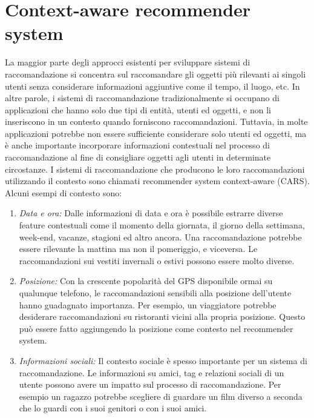 \section{Context-aware recommender system}
La maggior parte degli approcci esistenti per sviluppare sistemi di raccomandazione si concentra sul raccomandare gli oggetti più rilevanti ai singoli utenti senza considerare informazioni aggiuntive come il tempo, il luogo, etc. In altre parole, i sistemi di raccomandazione tradizionalmente si occupano di applicazioni che hanno solo due tipi di entità, utenti ed oggetti, e non li inseriscono in un contesto quando forniscono raccomandazioni. Tuttavia, in molte applicazioni potrebbe non essere sufficiente considerare solo utenti ed oggetti, ma è anche importante incorporare informazioni contestuali nel processo di raccomandazione al fine di consigliare oggetti agli utenti in determinate circostanze. I sistemi di raccomandazione che producono le loro raccomandazioni utilizzando il contesto sono chiamati recommender system context-aware (CARS). Alcuni esempi di contesto sono:

\begin{enumerate}
 \item \textit{Data e ora:} Dalle informazioni di data e ora è possibile estrarre diverse feature contestuali come il momento della giornata, il giorno della settimana, week-end, vacanze, stagioni ed altro ancora. Una raccomandazione potrebbe essere rilevante la mattina ma non il pomeriggio, e viceversa. Le raccomandazioni sui vestiti invernali o estivi possono essere molto diverse.
 \item \textit{Posizione:} Con la crescente popolarità del GPS disponibile ormai su qualunque telefono, le raccomandazioni sensibili alla posizione dell'utente hanno guadagnato importanza. Per esempio, un viaggiatore potrebbe desiderare raccomandazioni su ristoranti vicini alla propria posizione. Questo può essere fatto aggiungendo la posizione come contesto nel recommender system.
 \item \textit{Informazioni sociali:} Il contesto sociale è spesso importante per un sistema di raccomandazione. Le informazioni su amici, tag e relazioni sociali di un utente possono avere un impatto sul processo di raccomandazione. Per esempio un ragazzo potrebbe scegliere di guardare un film diverso a seconda che lo guardi con i suoi genitori o con i suoi amici.
\end{enumerate} 


